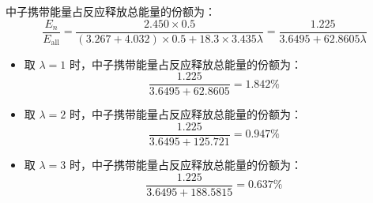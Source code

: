 \documentclass{article}
\begin{document}
中子携带能量占反应释放总能量的份额为：$$\frac{E_n}{E_\text{all}} = \frac{2.450 \times 0.5}{(3.267+4.032) \times 0.5 + 18.3 \times 3.435\lambda} = \frac{1.225}{3.6495 + 62.8605\lambda}$$

\begin{itemize}
    \item 取 $\lambda = 1$ 时，中子携带能量占反应释放总能量的份额为：$$\frac{1.225}{3.6495 + 62.8605} = 1.842\%$$
    \item 取 $\lambda = 2$ 时，中子携带能量占反应释放总能量的份额为：$$\frac{1.225}{3.6495 + 125.721} = 0.947\%$$
    \item 取 $\lambda = 3$ 时，中子携带能量占反应释放总能量的份额为：$$\frac{1.225}{3.6495 + 188.5815} = 0.637\%$$
\end{itemize}



\end{document}
